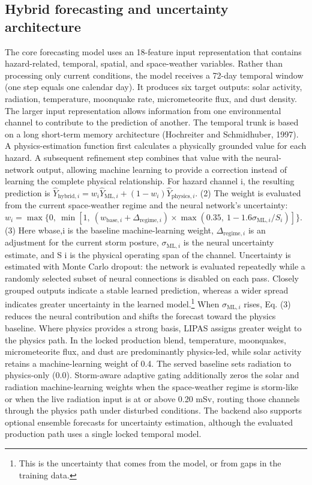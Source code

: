 \subsection{Hybrid forecasting and uncertainty architecture}

The core forecasting model uses an 18-feature input representation that contains hazard-related, temporal, spatial, and space-weather variables. Rather than processing only current conditions, the model receives a 72-day temporal window (one step equals one calendar day). It produces six target outputs: solar activity, radiation, temperature, moonquake rate, micrometeorite flux, and dust density. The larger input representation allows information from one environmental channel to contribute to the prediction of another. The temporal trunk is based on a long short-term memory architecture (Hochreiter and Schmidhuber, 1997). A physics-estimation function first calculates a physically grounded value for each hazard. A subsequent refinement step combines that value with the neural-network output, allowing machine learning to provide a correction instead of learning the complete physical relationship. For hazard channel i, the resulting prediction is $\hat{Y}_{\mathrm{hybrid},i} = w_i\hat{Y}_{\mathrm{ML},i} + (1-w_i)\hat{Y}_{\mathrm{physics},i}$. (2) The weight is evaluated from the current space-weather regime and the neural network's uncertainty: $w_i = \max\{0,\ \min[1,\ (w_{\mathrm{base},i}+\Delta_{\mathrm{regime},i})\times\max(0.35,\ 1-1.6\sigma_{\mathrm{ML},i}/S_i)]\}$. (3) Here wbase,i is the baseline machine-learning weight, $\Delta_{\mathrm{regime},i}$ is an adjustment for the current storm posture, $\sigma_{\mathrm{ML},i}$ is the neural uncertainty estimate, and S i is the physical operating span of the channel. Uncertainty is estimated with Monte Carlo dropout: the network is evaluated repeatedly while a randomly selected subset of neural connections is disabled on each pass. Closely grouped outputs indicate a stable learned prediction, whereas a wider spread indicates greater uncertainty in the learned model.\footnote{This is the uncertainty that comes from the model, or from gaps in the training data.} When $\sigma_{\mathrm{ML},i}$ rises, Eq. (3) reduces the neural contribution and shifts the forecast toward the physics baseline. Where physics provides a strong basis, LIPAS assigns greater weight to the physics path. In the locked production blend, temperature, moonquakes, micrometeorite flux, and dust are predominantly physics-led, while solar activity retains a machine-learning weight of 0.4. The served baseline sets radiation to physics-only (0.0). Storm-aware adaptive gating additionally zeros the solar and radiation machine-learning weights when the space-weather regime is storm-like or when the live radiation input is at or above 0.20 mSv, routing those channels through the physics path under disturbed conditions. The backend also supports optional ensemble forecasts for uncertainty estimation, although the evaluated production path uses a single locked temporal model.

